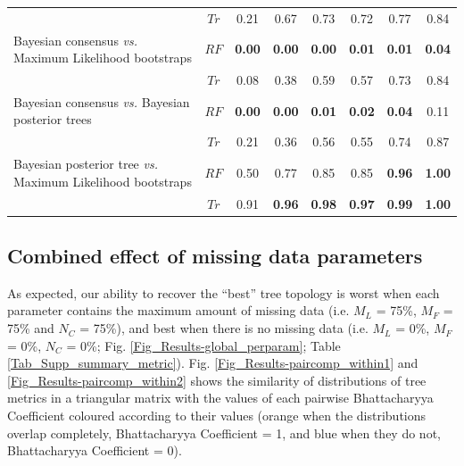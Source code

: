 \begin{landscape}
\begin{table}[!htb]
\begin{tabular}{lccccccc}
                                                                       & $Tr$ & 0.21 & 0.67 & 0.73 & 0.72 & 0.77 & 0.84 \\ 
    Bayesian consensus \textit{vs.} Maximum Likelihood bootstraps      & $RF$ & \textbf{0.00} & \textbf{0.00} & \textbf{0.00} & \textbf{0.01} & \textbf{0.01} & \textbf{0.04} \\ 
                                                                       & $Tr$ & 0.08 & 0.38 & 0.59 & 0.57 & 0.73 & 0.84 \\ 
    Bayesian consensus \textit{vs.} Bayesian posterior trees           & $RF$ & \textbf{0.00} & \textbf{0.00} & \textbf{0.01} & \textbf{0.02} & \textbf{0.04} & 0.11 \\ 
                                                                       & $Tr$ & 0.21 & 0.36 & 0.56 & 0.55 & 0.74 & 0.87 \\ 
    Bayesian posterior tree \textit{vs.} Maximum Likelihood bootstraps & $RF$ & 0.50 & 0.77 & 0.85 & 0.85 & \textbf{0.96} & \textbf{1.00} \\ 
                                                                       & $Tr$ & 0.91 & \textbf{0.96} & \textbf{0.98} & \textbf{0.97} & \textbf{0.99} & \textbf{1.00} \\   
   \hline
\end{tabular}
\end{table}
\end{landscape}

\subsection{Combined effect of missing data parameters}
As expected, our ability to recover the ``best'' tree topology is worst when each parameter contains the maximum amount of missing data (i.e. $M_{L}$ = 75\%, $M_{F}$ = 75\% and $N_{C}$ = 75\%), and best when there is no missing data (i.e. $M_{L}$ = 0\%, $M_{F}$ = 0\%, $N_{C}$ = 0\%; Fig. \ref{Fig_Results-global_perparam}; Table \ref{Tab_Supp_summary_metric}).
Fig. \ref{Fig_Results-paircomp_within1} and \ref{Fig_Results-paircomp_within2} shows the similarity of distributions of tree metrics in a triangular matrix with the values of each pairwise Bhattacharyya Coefficient coloured according to their values (orange when the distributions overlap completely, Bhattacharyya Coefficient = 1, and blue when they do not, Bhattacharyya Coefficient = 0). 

